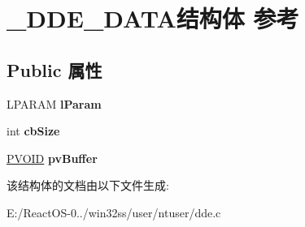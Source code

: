 \hypertarget{struct___d_d_e___d_a_t_a}{}\section{\+\_\+\+D\+D\+E\+\_\+\+D\+A\+T\+A结构体 参考}
\label{struct___d_d_e___d_a_t_a}
\subsection*{Public 属性}
\begin{DoxyCompactItemize}
\item 
\mbox{\label{struct___d_d_e___d_a_t_a_aa98857c50d005f53ef62e801e117fc8a}} 
L\+P\+A\+R\+AM {\bfseries l\+Param}
\item 
\mbox{\label{struct___d_d_e___d_a_t_a_a139c351bf5c7c58ada9e4240f056a4a4}} 
int {\bfseries cb\+Size}
\item 
\mbox{\label{struct___d_d_e___d_a_t_a_a81956de33ac4f276d776a03ea82102ce}} 
\hyperlink{interfacevoid}{P\+V\+O\+ID} {\bfseries pv\+Buffer}
\end{DoxyCompactItemize}


该结构体的文档由以下文件生成\+:\begin{DoxyCompactItemize}
\item 
E\+:/\+React\+O\+S-\/0../win32ss/user/ntuser/dde.\+c\end{DoxyCompactItemize}
